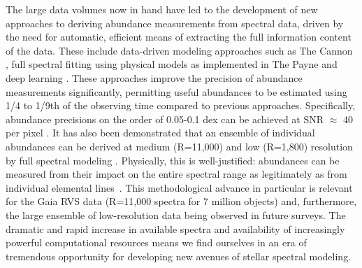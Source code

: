 \documentclass[a4paper,fleqn,usenatbib]{mnras}
\begin{document}

The large data volumes now in hand have led to the development of new approaches to deriving abundance measurements from spectral data, driven by the need for automatic, efficient means of extracting the full information content of the data. These include data-driven modeling approaches such as The Cannon \citep{Ness2015}, full spectral fitting using physical models as implemented in The Payne \citep{Ting2018} and  deep learning \citep{Leung2019}. These approaches improve the precision of abundance measurements significantly, permitting useful abundances to be estimated using 1/4 to 1/9th of the observing time compared to previous approaches. Specifically, abundance precisions on the order of 0.05-0.1 dex can be achieved at SNR $\approx$ 40 per pixel \citep{Ho2017b,Ness2018,Ting2018, Leung2019}. It has also been demonstrated that an ensemble of individual abundances can be derived at medium (R=11,000) and low (R=1,800) resolution by full spectral modeling \citep[e.g.][and Wheeler et al., in prep]{Casey2016,Ting2017}. Physically, this is well-justified: abundances can be measured from their impact on the entire spectral range as legitimately as from individual elemental lines~\citep[e.g.][]{Ting2018}. This methodological advance in particular is relevant for the Gaia RVS data (R=11,000 spectra for 7 million objects) and, furthermore, the large ensemble of low-resolution data being observed in future surveys. The dramatic and rapid increase in available spectra and availability of increasingly powerful computational resources means we find ourselves in an era of tremendous opportunity for developing new avenues of stellar spectral modeling.
\end{document}
